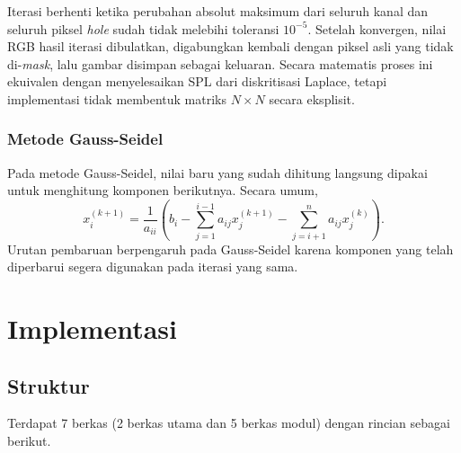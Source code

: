 \documentclass[12pt,a4paper]{report}
\begin{document}
Iterasi berhenti ketika perubahan absolut maksimum dari seluruh kanal dan seluruh piksel \textit{hole} sudah tidak melebihi toleransi $10^{-5}$. Setelah konvergen, nilai RGB hasil iterasi dibulatkan, digabungkan kembali dengan piksel asli yang tidak di-\textit{mask}, lalu gambar disimpan sebagai keluaran. Secara matematis proses ini ekuivalen dengan menyelesaikan SPL dari diskritisasi Laplace, tetapi implementasi tidak membentuk matriks $N\times N$ secara eksplisit.

\subsection{Metode Gauss-Seidel}

Pada metode Gauss-Seidel, nilai baru yang sudah dihitung langsung dipakai untuk menghitung komponen berikutnya. \cite{pakrin-iteratif} Secara umum,
\begin{equation*}
x_i^{(k+1)}
=
\frac{1}{a_{ii}}
\left(
b_i
-\sum_{j=1}^{i-1}a_{ij}x_j^{(k+1)}
-\sum_{j=i+1}^{n}a_{ij}x_j^{(k)}
\right).
\end{equation*}
Urutan pembaruan berpengaruh pada Gauss-Seidel karena komponen yang telah diperbarui segera digunakan pada iterasi yang sama. \cite{berkeley-gs}

\chapter{Implementasi}
\section{Struktur}

Terdapat 7 berkas (2 berkas utama dan 5 berkas modul) dengan rincian sebagai berikut.
\end{document}
